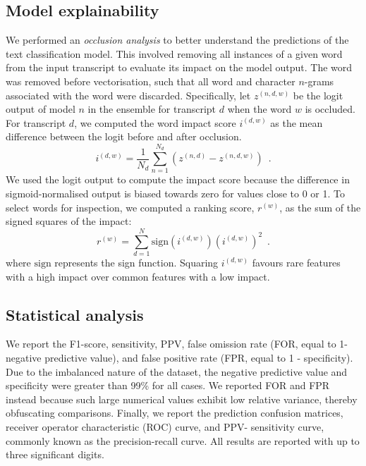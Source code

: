 {\subsection{Model explainability}\label{sec_retrospective:model_explainability}

We performed an \emph{occlusion analysis} to better understand the predictions of the text classification model. This involved removing all instances of a given word from the input transcript to evaluate its impact on the model output. The word was removed before vectorisation, such that all word and character $n$-grams associated with the word were discarded. Specifically, let $z^{(n, d, w)}$ be the logit output of model $n$ in the ensemble for transcript $d$ when the word $w$ is occluded. For transcript $d$, we computed the word impact score $i^{(d, w)}$ as the mean difference between the logit before and after occlusion.
%
\begin{equation}
    i^{(d,w)} = \frac{1}{N_d} \sum_{n=1}^{N_d} \left( z^{(n, d)} - z^{(n, d, w)} \right) \enspace .
\end{equation}
%
We used the logit output to compute the impact score because the difference in sigmoid-normalised output is biased towards zero for values close to 0 or 1. To select words for inspection, we computed a ranking score, $r^{(w)}$, as the sum of the signed squares of the impact:
%
\begin{equation}
    r^{(w)} = \sum_{d=1}^{N} \text{sign}\left( i^{(d, w)} \right) \left( i^{(d,w)}\right) ^2 \enspace .
\end{equation}
%
where $\text{sign}$ represents the sign function. Squaring $i^{(d,w)}$ favours rare features with a high impact over common features with a low impact.


\subsection{Statistical analysis}

We report the F1-score, sensitivity, PPV, false omission rate (FOR, equal to 1- negative predictive value), and false positive rate (FPR, equal to 1 - specificity). Due to the imbalanced nature of the dataset, the negative predictive value and specificity were greater than 99\% for all cases. We reported FOR and FPR instead because such large numerical values exhibit low relative variance, thereby obfuscating comparisons. Finally, we report the prediction confusion matrices, receiver operator characteristic (ROC) curve, and PPV- sensitivity curve, commonly known as the precision-recall curve. All results are reported with up to three significant digits.

}
